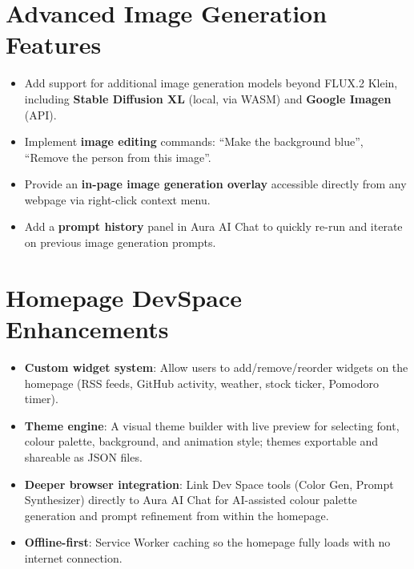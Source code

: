 \section{Advanced Image Generation Features}
\begin{itemize}[leftmargin=*]
    \item Add support for additional image generation models beyond FLUX.2 Klein, including \textbf{Stable Diffusion XL} (local, via WASM) and \textbf{Google Imagen} (API).
    \item Implement \textbf{image editing} commands: ``Make the background blue'', ``Remove the person from this image''.
    \item Provide an \textbf{in-page image generation overlay} accessible directly from any webpage via right-click context menu.
    \item Add a \textbf{prompt history} panel in Aura AI Chat to quickly re-run and iterate on previous image generation prompts.
\end{itemize}

\section{Homepage DevSpace Enhancements}
\begin{itemize}[leftmargin=*]
    \item \textbf{Custom widget system}: Allow users to add/remove/reorder widgets on the homepage (RSS feeds, GitHub activity, weather, stock ticker, Pomodoro timer).
    \item \textbf{Theme engine}: A visual theme builder with live preview for selecting font, colour palette, background, and animation style; themes exportable and shareable as JSON files.
    \item \textbf{Deeper browser integration}: Link Dev Space tools (Color Gen, Prompt Synthesizer) directly to Aura AI Chat for AI-assisted colour palette generation and prompt refinement from within the homepage.
    \item \textbf{Offline-first}: Service Worker caching so the homepage fully loads with no internet connection.
\end{itemize}

